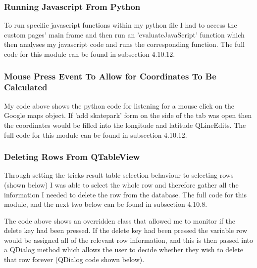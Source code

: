 \begin{landscape}
\subsubsection{Running Javascript From Python}

To run specific javascript functions within my python file I had to access the custom pages' main frame and then run an 'evaluateJavaScript' function which then analyses my javascript code and runs the corresponding function. The full code for this module can be found in subsection 4.10.12.


\subsubsection{Mouse Press Event To Allow for Coordinates To Be Calculated}

My code above shows the python code for listening for a mouse click on the Google maps object. If 'add skatepark' form on the side of the tab was open then the coordinates would be filled into the longitude and latitude QLineEdits. The full code for this module can be found in subsection 4.10.12.



\subsubsection{Deleting Rows From QTableView}

Through setting the tricks result table selection behaviour to selecting rows (shown below) 
I was able to select the whole row and therefore gather all the information I needed to delete the row from the database. The full code for this module, and the next two below can be found in subsection 4.10.8.


The code above shows an overridden class that allowed me to monitor if the delete key had been pressed. If the delete key had been pressed the variable row would be assigned all of the relevant row information, and this is then passed into a QDialog method which allows the user to decide whether they wish to delete that row forever (QDialog code shown below). 



\end{landscape}
